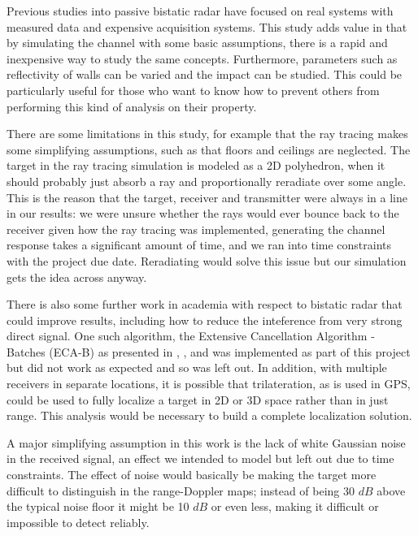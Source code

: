 \documentclass[article,11pt,onecolumn,final]{IEEEtran}
\begin{document}
Previous studies into passive bistatic radar have focused on real systems with measured data and expensive
acquisition systems. This study adds value in that by simulating the channel with some basic assumptions, there 
is a rapid and inexpensive way to study the same concepts. Furthermore, parameters such as reflectivity of
walls can be varied and the impact can be studied. This could be particularly useful for those who want to know
how to prevent others from performing this kind of analysis on their property.

There are some limitations in this study, for example that the ray tracing makes some simplifying assumptions, 
such as that floors and ceilings are neglected. The target in the ray tracing simulation is modeled as a 2D polyhedron, when it should probably just absorb a ray and proportionally reradiate over some angle. This is the reason that the target, receiver and transmitter were always in a line in our results: we were unsure whether the rays would ever bounce back to the receiver given how the ray tracing was implemented, generating the channel response takes a significant amount of time, and we ran into time constraints with the project due date. Reradiating would solve this issue but our simulation gets the idea across anyway. 

There is also some further work in academia with respect to bistatic
radar that could improve results, including how to reduce the inteference from very strong direct signal. One such algorithm, the Extensive Cancellation Algorithm - Batches (ECA-B) as presented in \cite{Colone2006}, \cite{Colone2009}, and \cite{Colone2012} was implemented as part of this project but did not work as expected and so was left out. In addition, with multiple receivers
in separate locations, it is possible that trilateration, as is used in GPS, could be used to fully localize a target in 2D or 3D space rather than in just range. This analysis would be necessary to build a complete localization solution.

A major simplifying assumption in this work is the lack of white Gaussian noise in the received signal, an effect we intended to model but left out due to time constraints. The effect of noise would basically be making the target more difficult to distinguish in the range-Doppler maps; instead of being 30 $dB$ above the typical noise floor it might be 10 $dB$ or even less, making it difficult or impossible to detect reliably. 
\end{document}

